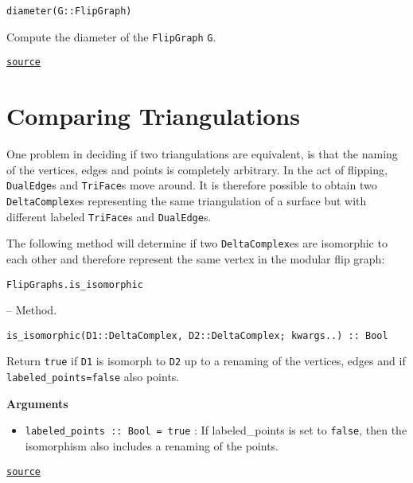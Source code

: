 \begin{adjustwidth}{2em}{0pt}


\begin{verbatim}
diameter(G::FlipGraph)
\end{verbatim}

Compute the diameter of the \texttt{FlipGraph} \texttt{G}.



\href{https://github.com/schto223/FlipGraphs.jl/blob/e35d43698a06b86273148826b79d585ba04fcd26/src/flipGraph.jl#L602-L606}{\texttt{source}}


\end{adjustwidth}

\section{Comparing Triangulations}



\label{9598979154961159507}{}


One problem in deciding if two triangulations are equivalent, is that the naming of the vertices, edges and points is completely arbitrary. In the act of flipping, \texttt{DualEdge}s and \texttt{TriFace}s {\textquotedbl}move around{\textquotedbl}. It is therefore possible to obtain two \texttt{DeltaComplex}es representing the same triangulation of a surface but with different labeled \texttt{TriFace}s and \texttt{DualEdge}s. 



The following method will determine if two \texttt{DeltaComplex}es are isomorphic to each other and therefore represent the same vertex in the modular flip graph:


\hypertarget{11364192622904495301}{\texttt{FlipGraphs.is\_isomorphic}}  -- {Method.}

\begin{adjustwidth}{2em}{0pt}


\begin{verbatim}
is_isomorphic(D1::DeltaComplex, D2::DeltaComplex; kwargs..) :: Bool
\end{verbatim}

Return \texttt{true} if \texttt{D1} is isomorph to \texttt{D2} up to a renaming of the vertices, edges and if \texttt{labeled\_points=false} also points.

\textbf{Arguments}

\begin{itemize}
\item \texttt{labeled\_points :: Bool = true} : If labeled\_points is set to \texttt{false}, then the isomorphism also includes a renaming of the points. 

\end{itemize}


\href{https://github.com/schto223/FlipGraphs.jl/blob/e35d43698a06b86273148826b79d585ba04fcd26/src/flipGraph.jl#L492-L499}{\texttt{source}}


\end{adjustwidth}

